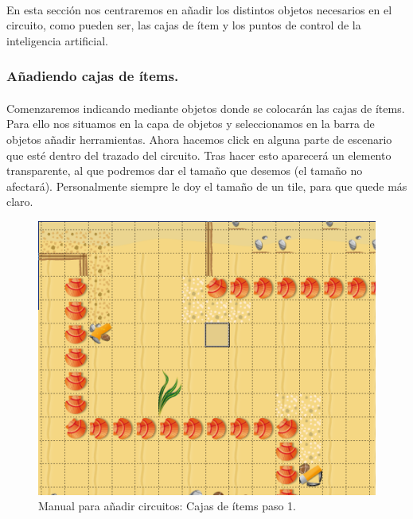 \paragraph{}
En esta sección nos centraremos en añadir los distintos objetos necesarios en el circuito, como pueden ser, las cajas de ítem
y los puntos de control de la inteligencia artificial.

\subsubsection{Añadiendo cajas de ítems.}

\paragraph{}
Comenzaremos indicando mediante objetos donde se colocarán las cajas de ítems. Para ello nos situamos en la capa de objetos y 
seleccionamos en la barra de objetos añadir herramientas. Ahora hacemos click en alguna parte de escenario que esté dentro del
trazado del circuito. Tras hacer esto aparecerá un elemento transparente, al que podremos dar el tamaño que desemos (el tamaño no
afectará). Personalmente siempre le doy el tamaño de un tile, para que quede más claro.

\begin{figure}[H]
  \label{cajas_items1}
  \begin{center}
    \includegraphics[scale=0.5]{imagenes/manualcircuito/cajas_items1.png}
  \end{center}
  \caption{Manual para añadir circuitos: Cajas de ítems paso 1.}
\end{figure}

